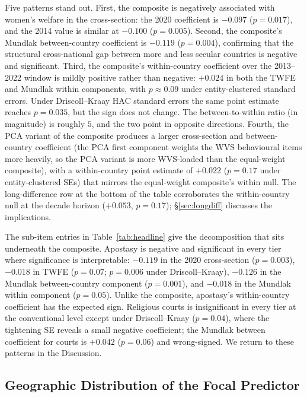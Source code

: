 \documentclass[12pt,a4paper]{article}
\begin{document}
Five patterns stand out. First, the composite is negatively associated with women's welfare in the cross-section: the 2020 coefficient is $-0.097$ ($p = 0.017$), and the 2014 value is similar at $-0.100$ ($p = 0.005$). Second, the composite's Mundlak between-country coefficient is $-0.119$ ($p = 0.004$), confirming that the structural cross-national gap between more and less secular countries is negative and significant. Third, the composite's within-country coefficient over the 2013--2022 window is mildly positive rather than negative: $+0.024$ in both the TWFE and Mundlak within components, with $p \approx 0.09$ under entity-clustered standard errors. Under Driscoll--Kraay HAC standard errors the same point estimate reaches $p = 0.035$, but the sign does not change. The between-to-within ratio (in magnitude) is roughly $5$, and the two point in opposite directions. Fourth, the PCA variant of the composite produces a larger cross-section and between-country coefficient (the PCA first component weights the WVS behavioural items more heavily, so the PCA variant is more WVS-loaded than the equal-weight composite), with a within-country point estimate of $+0.022$ ($p = 0.17$ under entity-clustered SEs) that mirrors the equal-weight composite's within null. The long-difference row at the bottom of the table corroborates the within-country null at the decade horizon ($+0.053$, $p = 0.17$); \S\ref{sec:longdiff} discusses the implications.

The sub-item entries in Table~\ref{tab:headline} give the decomposition that sits underneath the composite. Apostasy is negative and significant in every tier where significance is interpretable: $-0.119$ in the 2020 cross-section ($p = 0.003$), $-0.018$ in TWFE ($p = 0.07$; $p = 0.006$ under Driscoll--Kraay), $-0.126$ in the Mundlak between-country component ($p = 0.001$), and $-0.018$ in the Mundlak within component ($p = 0.05$). Unlike the composite, apostasy's within-country coefficient has the expected sign. Religious courts is insignificant in every tier at the conventional level except under Driscoll--Kraay ($p = 0.04$), where the tightening SE reveals a small negative coefficient; the Mundlak between coefficient for courts is $+0.042$ ($p = 0.06$) and wrong-signed. We return to these patterns in the Discussion.

\subsection{Geographic Distribution of the Focal Predictor}
\end{document}
